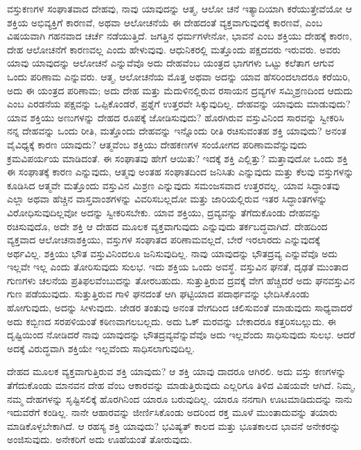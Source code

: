 ವಸ್ತುಕಣಗಳ ಸಂಘಾತವಾದ ದೇಹವು, ನಾವು ಯಾವುದನ್ನು ಆತ್ಮ, ಆಲೋ ಚನೆ ಇತ್ಯಾದಿಯಾಗಿ ಕರೆಯುತ್ತೇವೆಯೋ ಆ ಶಕ್ತಿಯ ಅಭಿವ್ಯಕ್ತಿಗೆ ಕಾರಣವೆ, ಅಥವಾ ಆಲೋಚನೆಯೆ ಈ ದೇಹದಂತೆ ವ್ಯಕ್ತವಾಗುವುದಕ್ಕೆ ಕಾರಣವೆ, ಎಂಬ ವಿಷಯವಾಗಿ ಗಹನವಾದ ಚರ್ಚೆ ನಡೆಯುತ್ತಿದೆ. ಜಗತ್ತಿನ ಧರ್ಮಗಳೇನೋ, ಭಾವನೆ ಎಂಬ ಶಕ್ತಿಯು ದೇಹಕ್ಕೆ ಕಾರಣ, ದೇಹ ಆಲೋಚನೆಗೆ ಕಾರಣವಲ್ಲ ಎಂದು ಹೇಳುವುವು. ಆಧುನಿಕರಲ್ಲಿ ಮತ್ತೊಂದು ಪಕ್ಷದವರು ಇರುವರು. ಅವರು ಯಾವು ಯಾವುದನ್ನು ಆಲೋಚನೆ ಎನ್ನುವೆವೊ ಅದು ದೇಹವೆಂಬ ಯಂತ್ರದ ಭಾಗಗಳು ಒಟ್ಟು ಕಲೆತಾಗ ಆಗುವ ಒಂದು ಪರಿಣಾಮ ಎನ್ನುವರು. ಆತ್ಮ, ಆಲೋಚನೆಯ ಮೊತ್ತ ಅಥವಾ ಅದನ್ನು ಯಾವ ಹೆಸರಿಂದಲಾದರೂ ಕರೆಯಿರಿ, ಅದು ಈ ಯಂತ್ರದ ಪರಿಣಾಮ; ಅದು ದೇಹ ಮತ್ತು ಮೆದುಳಿನಲ್ಲಿರುವ ರಸಾಯನ ದ್ರವ್ಯಗಳ ಸಮ್ಮಿಶ್ರಣದಿಂದ ಆದುದು ಎಂಬ ಎರಡನೆಯ ಪಕ್ಷವನ್ನು ಒಪ್ಪಿಕೊಂಡರೆ, ಪ್ರಶ್ನೆಗೆ ಉತ್ತರವೇ ಸಿಕ್ಕುವುದಿಲ್ಲ. ದೇಹವನ್ನು ಯಾವುದು ಮಾಡುವುದು? ಯಾವ ಶಕ್ತಿಯು ಅಣುಗಳನ್ನು ದೇಹದ ರೂಪಕ್ಕೆ ಜೋಡಿಸುವುದು? ಹೊರಗಿರುವ ವಸ್ತುವಿನಿಂದ ಸಾರವನ್ನು ಸ್ವೀಕರಿಸಿ ನನ್ನ ದೇಹವನ್ನು ಒಂದು ರೀತಿ, ಮತ್ತೊಂದು ದೇಹವನ್ನು ಇನ್ನೊಂದು ರೀತಿ ರಚಿಸುವಂತಹ ಶಕ್ತಿ ಯಾವುದು? ಅನಂತ ವೈವಿಧ್ಯಕ್ಕೆ ಕಾರಣ ಯಾವುದು? ಆತ್ಮವೆಂಬ ಶಕ್ತಿಯು ದೇಹಕಣಗಳ ಸಂಯೋಗದ ಪರಿಣಾಮವೆನ್ನುವುದು ಕ್ರಮವಿಪರ್ಯಯ ಮಾಡಿದಂತೆ. ಈ ಸಂಘಾತವು ಹೇಗೆ ಆಯಿತು? ಇದಕ್ಕೆ ಶಕ್ತಿ ಎಲ್ಲಿತ್ತು? ಮತ್ತಾವುದೋ ಒಂದು ಶಕ್ತಿ ಈ ಸಂಘಾತಕ್ಕೆ ಕಾರಣ ಎನ್ನುವುದು, ಆತ್ಮವು ಅಂತಹ ಸಂಘಾತದಿಂದ ಜನಿಸಿತು ಎನ್ನುವುದು ಮತ್ತು ಕೆಲವು ವಸ್ತುಗಳನ್ನು ಕೂಡಿಸಿದ ಆತ್ಮವೇ ಮತ್ತೊಂದು ವಸ್ತುವಿನ ಮಿಶ್ರಣ ಎನ್ನುವುದು ಸಮಂಜಸವಾದ ಉತ್ತರವಲ್ಲ. ಯಾವ ಸಿದ್ಧಾಂತವು ಎಲ್ಲಾ ಅಥವಾ ಹೆಚ್ಚಿನ ವಾಸ್ತವಾಂಶಗಳನ್ನು ವಿವರಿಸಬಲ್ಲದೋ ಮತ್ತು ಜಾರಿಯಲ್ಲಿರುವ ಇತರ ಸಿದ್ಧಾಂತಗಳನ್ನು ವಿರೋಧಿಸುವುದಿಲ್ಲವೋ ಅದನ್ನು ಸ್ವೀಕರಿಸಬೇಕು. ಯಾವ ಶಕ್ತಿಯು, ದ್ರವ್ಯವನ್ನು ತೆಗೆದುಕೊಂಡು ದೇಹವನ್ನು ರಚಿಸುವುದೊ, ಅದೇ ಶಕ್ತಿ ಆ ದೇಹದ ಮೂಲಕ ವ್ಯಕ್ತವಾಗುವುದು ಎನ್ನುವುದು ತರ್ಕಬದ್ಧವಾಗಿದೆ. ದೇಹದಿಂದ ವ್ಯಕ್ತವಾದ ಆಲೋಚನಾಶಕ್ತಿಯು, ವಸ್ತುಗಳ ಸಂಘಾತದ ಪರಿಣಾಮವಲ್ಲದೆ, ಬೇರೆ ಇರಲಾರದು ಎನ್ನುವುದಕ್ಕೆ ಅರ್ಥವಿಲ್ಲ. ಶಕ್ತಿಯು ಭೌತ ವಸ್ತುವಿನಿಂದಲೂ ಜನಿಸುವುದಿಲ್ಲ. ನಾವು ಯಾವುದನ್ನು ಭೌತದ್ರವ್ಯ ಎನ್ನುವೆವೊ ಅದು ಇಲ್ಲವೇ ಇಲ್ಲ ಎಂದು ತೋರಿಸುವುದು ಸುಲಭ. ಇದು ಶಕ್ತಿಯ ಒಂದು ಅವಸ್ಥೆ. ವಸ್ತುವಿನ ಘನತೆ, ದೃಢತೆ ಮುಂತಾದ ಗುಣಗಳು ಚಲನೆಯ ಪ್ರತಿಫಲವೆಂಬುದನ್ನು ತೋರಬಹುದು. ಸುತ್ತುತ್ತಿರುವ ದ್ರವಕ್ಕೆ ವೇಗ ಹೆಚ್ಚಿದರೆ ಅದು ಘನವಸ್ತುವಿನ ಗುಣ ಪಡೆಯುವುದು. ಸುತ್ತುತ್ತಿರುವ ಗಾಳಿ ಘನದಂತೆ ಆಗಿ ಘಟ್ಟಿಯಾದ ಪದಾರ್ಥವನ್ನು ಭೇದಿಸಿಕೊಂಡು ಹೋಗುವುದು, ಅದನ್ನು ಸೀಳುವುದು. ಜೇಡರ ತಂತುವು ಅನಂತ ವೇಗದಿಂದ ಚಲಿಸುವಂತೆ ಮಾಡುವುದು ಸಾಧ್ಯವಾದರೆ ಅದು ಕಬ್ಬಿಣದ ಸರಪಳಿಯಂತೆ ಕಠಿಣವಾಗಲಬಲ್ಲದು. ಅದು ಓಕ್​ ಮರವನ್ನು ಬೇಕಾದರೂ ಕತ್ತರಿಸಬಲ್ಲುದು. ಈ ದೃಷ್ಟಿಯಿಂದ ನೋಡಿದರೆ ನಾವು ಯಾವುದನ್ನು ಭೌತದ್ರವ್ಯವೆನ್ನುವೆವೊ ಅದು ಇಲ್ಲವೆಂದು ಸಾಧಿಸುವುದು ಸುಲಭ. ಆದರೆ ಅದಕ್ಕೆ ವಿರುದ್ಧವಾಗಿ ಶಕ್ತಿಯೇ ಇಲ್ಲವೆಂದು ಸಾಧಿಸಲಾಗುವುದಿಲ್ಲ.

ದೇಹದ ಮೂಲಕ ವ್ಯಕ್ತವಾಗುತ್ತಿರುವ ಶಕ್ತಿ ಯಾವುದು? ಆ ಶಕ್ತಿ ಯಾವು ದಾದರೂ ಆಗಿರಲಿ. ಅದು ವಸ್ತು ಕಣಗಳನ್ನು ತೆಗೆದುಕೊಂಡು ಮಾನವನ ದೇಹ ವೆಂಬ ಆಕಾರವನ್ನು ಮಾಡುತ್ತಿರುವುದು ಎಲ್ಲರಿಗೂ ತಿಳಿದ ವಿಷಯವೇ ಆಗಿದೆ. ನಿಮ್ಮ, ನಮ್ಮ ದೇಹಗಳನ್ನು ಸೃಷ್ಟಿಸಲಿಕ್ಕೆ ಹೊರಗಿನಿಂದ ಯಾರೂ ಬರುವುದಿಲ್ಲ. ಯಾರೂ ನನಗಾಗಿ ಊಟಮಾಡಿದುದನ್ನು ನಾನು ಇದುವರೆಗೆ ಕಂಡಿಲ್ಲ. ನಾನೇ ಆಹಾರವನ್ನು ಜೀರ್ಣಿಸಿಕೊಂಡು ಅದರಿಂದ ರಕ್ತ ಮೂಳೆ ಮುಂತಾದುವನ್ನು ತಯಾರು ಮಾಡಿಕೊಳ್ಳಬೇಕಾಗಿದೆ. ಆ ರಹಸ್ಯ ಶಕ್ತಿ ಯಾವುದು? ಭವಿಷ್ಯತ್​ ಕಾಲದ ಮತ್ತು ಭೂತಕಾಲದ ಭಾವನೆ ಅನೇಕರನ್ನು ಅಂಜಿಸುವುದು. ಅನೇಕರಿಗೆ ಅದು ಊಹೆಯಂತೆ ತೋರುವುದು.

